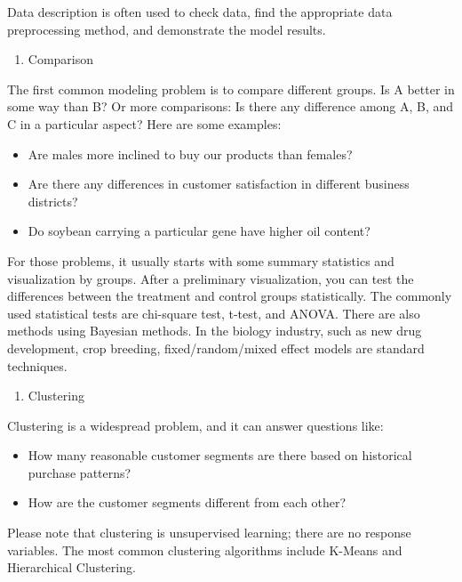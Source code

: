 \documentclass[12pt,]{krantz}
\providecommand{\tightlist}{%
  \setlength{\itemsep}{0pt}\setlength{\parskip}{0pt}}
\begin{document}
Data description is often used to check data, find the appropriate data preprocessing method, and demonstrate the model results.

\begin{enumerate}
\def\labelenumi{\arabic{enumi}.}
\setcounter{enumi}{1}
\tightlist
\item
  Comparison
\end{enumerate}

The first common modeling problem is to compare different groups. Is A better in some way than B? Or more comparisons: Is there any difference among A, B, and C in a particular aspect? Here are some examples:

\begin{itemize}
\tightlist
\item
  Are males more inclined to buy our products than females?
\item
  Are there any differences in customer satisfaction in different business districts?
\item
  Do soybean carrying a particular gene have higher oil content?
\end{itemize}

For those problems, it usually starts with some summary statistics and visualization by groups. After a preliminary visualization, you can test the differences between the treatment and control groups statistically. The commonly used statistical tests are chi-square test, t-test, and ANOVA. There are also methods using Bayesian methods. In the biology industry, such as new drug development, crop breeding, fixed/random/mixed effect models are standard techniques.

\begin{enumerate}
\def\labelenumi{\arabic{enumi}.}
\setcounter{enumi}{2}
\tightlist
\item
  Clustering
\end{enumerate}

Clustering is a widespread problem, and it can answer questions like:

\begin{itemize}
\tightlist
\item
  How many reasonable customer segments are there based on historical purchase patterns?
\item
  How are the customer segments different from each other?
\end{itemize}

Please note that clustering is unsupervised learning; there are no response variables. The most common clustering algorithms include K-Means and Hierarchical Clustering.
\end{document}
